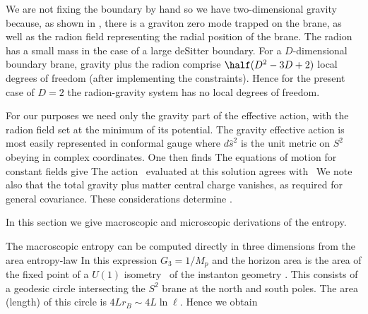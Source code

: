 We are not fixing the boundary by hand so 
we have
two-dimensional
gravity because, as shown in \rs, there is a graviton zero mode
trapped on the brane, as well as the radion field representing the
radial position
of the brane. The radion has a small mass in the case of a large deSitter
boundary. For a $D$-dimensional boundary brane, gravity plus the radion
comprise $\half(D^2-3D+2)$ local degrees of freedom (after implementing the
constraints). Hence for the present case of $D=2$ the radion-gravity system
has no local degrees of freedom.

For our purposes we need only the gravity
part of the effective action, with the radion field set at
the minimum of its potential. The gravity effective action
is most easily represented in conformal gauge
\eqn{}
where $d\hat s^2$ is the unit metric on $S^2$ obeying
\eqn{}
in complex coordinates.
One then finds
\eqn{}
The equations of motion for constant fields give
\eqn{}
The action \sacy\ evaluated at this solution agrees with \sfas\
We note also that the total gravity plus matter central
charge vanishes, as required for general covariance.
These considerations determine \sacy.




In this section we give macroscopic and microscopic derivations of the
entropy.

The macroscopic entropy can be computed directly in three dimensions
from the area entropy-law
\eqn{}
In this expression $G_3=1/M_p$ and the horizon area is the area of the
fixed point of a $U(1)$ isometry \hhu\ of the instanton geometry
\asgm. This consists of a geodesic circle intersecting the
$S^2$ brane at the north
and south poles. The area (length) of this circle is
$4Lr_B \sim 4L \ln \ell$. Hence we obtain
\eqn{}

